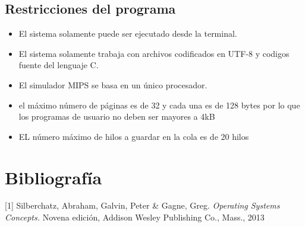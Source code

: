 \documentclass[12pt]{article}
\begin{document}
\subsection[Restricciones]{Restricciones del programa}
\begin{itemize}
  \item El sistema solamente puede ser ejecutado desde la terminal.
  \item El sistema solamente trabaja con archivos codificados en UTF-8 y codigos fuente del lenguaje C. 
  \item El simulador MIPS se basa en un único procesador.
  \item el máximo número de páginas es de 32 y cada una es de 128 bytes por lo que los programas de usuario no deben ser mayores a 4kB
  \item EL número máximo de hilos a guardar en la cola es de 20 hilos
  \end{itemize}
\newpage


\section{Bibliografía}

[1] Silberchatz, Abraham, Galvin, Peter \& Gagne, Greg. {\em  Operating Systems Concepts.} Novena edición, Addison Wesley Publishing Co., Mass., 2013 
\end{document}

